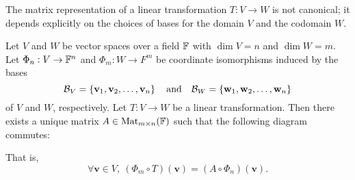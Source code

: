 \documentclass[11pt,openany]{article}
\renewcommand{\vec}[1]{\mathbf{#1}}
\begin{document}
\vspace{20pt}
\begin{remark*}
The matrix representation of a linear transformation $T:V\to W$ is not canonical; it depends explicitly on the choices of bases for the domain $V$ and the codomain $W$.
\end{remark*}
\newpage
\begin{observation}
Let $V$ and $W$ be vector spaces over a field $\mathbb{F}$ with $\dim V=n$ and $\dim W=m$. Let $\Phi_n:V\to\mathbb{F}^n$ and $\Phi_m:W\to F^m$ be coordinate isomorphisms induced by the bases \[
\basis_V=\set{\vec{v}_1,\vec{v}_2,\dots,\vec{v}_n}\quad\text{and}\quad\basis_W=\set{\vec{w}_1,\vec{w}_2,\dots,\vec{w}_n}
\] of $V$ and $W$, respectively. Let $T:V\to W$ be a linear transformation. Then there exists a unique matrix $A\in\operatorname{Mat}_{m\times n}(\mathbb{F})$ such that the following diagram commutes:
\begin{center}
\begin{minipage}{.49\textwidth}
\end{minipage}
\begin{minipage}{.49\textwidth}
That is, \[
\forall \vec{v}\in V,\ (\Phi_m\circ T)(\vec{v})=(A\circ \Phi_n)(\vec{v}).
\] 
\end{minipage}

\end{center}
\end{observation}
\end{document}
